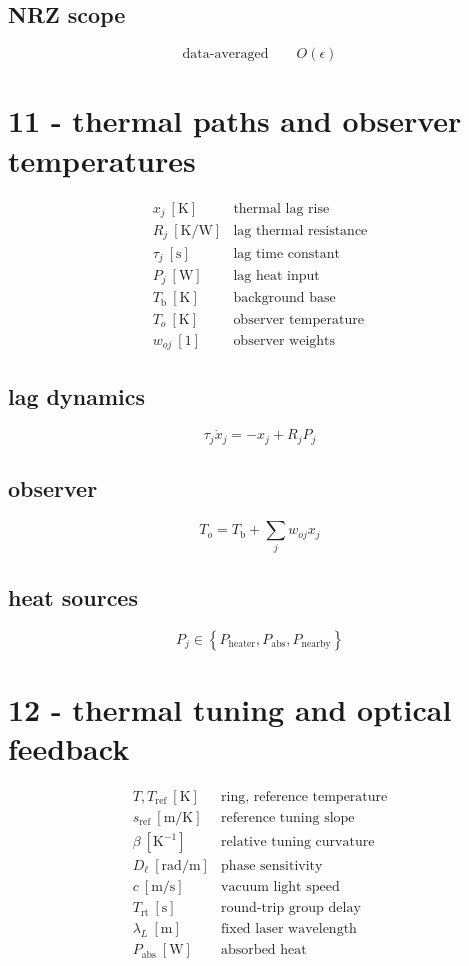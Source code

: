 \subsection*{NRZ scope}
\[
\displaystyle \text{data-averaged}\qquad O(\epsilon)
\]

\clearpage
\section*{11 - thermal paths and observer temperatures}

\[
\begin{array}{ll}x_j\ [\mathrm K]&\text{thermal lag rise}\\[0.6em]R_j\ [\mathrm{K/W}]&\text{lag thermal resistance}\\[0.6em]\tau_j\ [\mathrm s]&\text{lag time constant}\\[0.6em]P_j\ [\mathrm W]&\text{lag heat input}\\[0.6em]T_{\mathrm b}\ [\mathrm K]&\text{background base}\\[0.6em]T_o\ [\mathrm K]&\text{observer temperature}\\[0.6em]w_{oj}\ [1]&\text{observer weights}\end{array}
\]

\subsection*{lag dynamics}
\[
\displaystyle \tau_j\dot x_j=-x_j+R_jP_j
\]

\subsection*{observer}
\[
\displaystyle T_o=T_{\mathrm b}+\sum_jw_{oj}x_j
\]

\subsection*{heat sources}
\[
\displaystyle P_j\in\left\{P_{\mathrm{heater}},P_{\mathrm{abs}},P_{\mathrm{nearby}}\right\}
\]

\clearpage
\section*{12 - thermal tuning and optical feedback}

\[
\begin{array}{ll}T,T_{\mathrm{ref}}\ [\mathrm K]&\text{ring, reference temperature}\\[0.6em]s_{\mathrm{ref}}\ [\mathrm{m/K}]&\text{reference tuning slope}\\[0.6em]\beta\ [\mathrm{K}^{-1}]&\text{relative tuning curvature}\\[0.6em]D_\ell\ [\mathrm{rad/m}]&\text{phase sensitivity}\\[0.6em]c\ [\mathrm{m/s}]&\text{vacuum light speed}\\[0.6em]T_{\mathrm{rt}}\ [\mathrm s]&\text{round-trip group delay}\\[0.6em]\lambda_L\ [\mathrm m]&\text{fixed laser wavelength}\\[0.6em]P_{\mathrm{abs}}\ [\mathrm W]&\text{absorbed heat}\end{array}
\]


